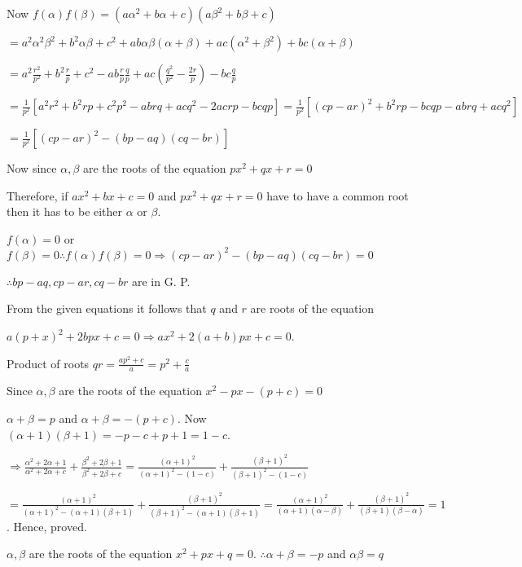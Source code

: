   Now $f(\alpha)f(\beta) = (a\alpha^2 + b\alpha + c)(a\beta^2 + b\beta + c)$

  $= a^2\alpha^2\beta^2 + b^2\alpha\beta + c^2 + ab\alpha\beta(\alpha + \beta) + ac(\alpha^2 + \beta^2) +
  bc(\alpha + \beta)$

  $= a^2\frac{r^2}{p^2} + b^2\frac{r}{p} + c^2 - ab\frac{r}{p}\frac{q}{p} + ac\left(\frac{q^2}{p^2} -
  \frac{2r}{p}\right) - bc\frac{q}{p}$

  $= \frac{1}{p^2}[a^2r^2 + b^2rp + c^2p^2 - abrq + acq^2 - 2acrp - bcqp] = \frac{1}{p^2}[(cp - ar)^2 +
    b^2rp - bcqp - abrq + acq^2]$

  $= \frac{1}{p^2}[(cp - ar)^2 - (bp - aq)(cq - br)]$

  Now since $\alpha, \beta$ are the roots of the equation $px^2 + qx + r = 0$

  Therefore, if $ax^2 + bx + c = 0$ and $px^2 + qx + r = 0$ have to have a common root then it has to be
  either $\alpha$ or $\beta$.

  $f(\alpha) = 0$ or $f(\beta) = 0 \therefore f(\alpha)f(\beta) = 0\Rightarrow (cp - ar)^2 - (bp - aq)(cq -
  br) = 0$

  $\therefore bp - aq, cp - ar, cq - br$ are in G. P.
\item From the given equations it follows that $q$ and $r$ are roots of the equation

  $a(p + x)^2 + 2bpx + c = 0 \Rightarrow ax^2 + 2(a + b)px + c = 0$.

  Product of roots $qr = \frac{ap^2 + c}{a} = p^2 + \frac{c}{a}$
\item Since $\alpha, \beta$ are the roots of the equation $x^2 - px - (p + c) = 0$

  $\alpha + \beta = p$ and $\alpha + \beta = -(p + c)$. Now $(\alpha + 1)(\beta + 1) = -p - c + p + 1 = 1 - c$.

  $\Rightarrow \frac{\alpha^2 + 2\alpha + 1}{\alpha^2 + 2\alpha + c} + \frac{\beta^2 + 2\beta + 1}{\beta^2 +
  2\beta + c} = \frac{(\alpha + 1)^2}{(\alpha + 1)^2 - (1 - c)} + \frac{(\beta + 1)^2}{(\beta + 1)^2 - (1 -
    c)}$

  $= \frac{(\alpha + 1)^2}{(\alpha + 1)^2 - (\alpha + 1)(\beta + 1)} + \frac{(\beta + 1)^2}{(\beta + 1)^2 -
    (\alpha + 1)(\beta + 1)} = \frac{(\alpha + 1)^2}{(\alpha + 1)(\alpha - \beta)} + \frac{(\beta +
  1)^2}{(\beta + 1)(\beta - \alpha)} = 1$. Hence, proved.
\item $\alpha, \beta$ are the roots of the equation $x^2 + px + q = 0$. $\therefore \alpha + \beta = -p$ and
  $\alpha\beta = q$

